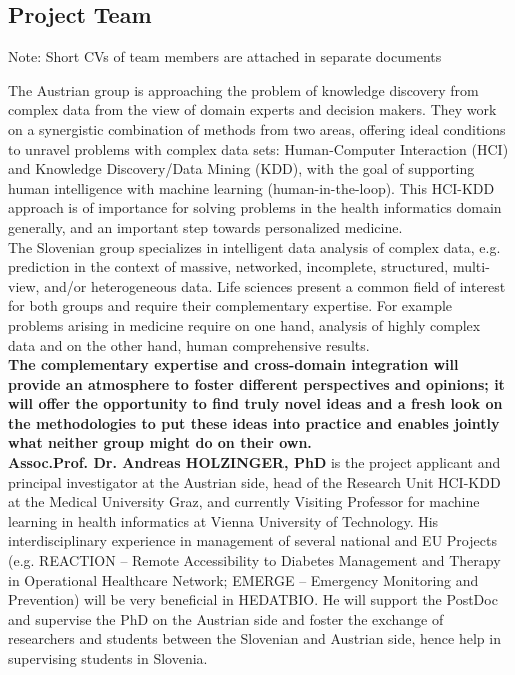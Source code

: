 \documentclass[a4paper,11pt]{article}
\begin{document}
\subsection{Project Team}
Note: Short CVs of team members are attached in separate documents

The Austrian group is approaching the problem of knowledge discovery from complex data from the view of domain experts and decision makers. They work on a synergistic combination of methods from two areas, offering ideal conditions to unravel problems with complex data sets: Human-Computer Interaction (HCI) and Knowledge Discovery/Data Mining (KDD), with the goal of supporting human intelligence with machine learning (human-in-the-loop). This HCI-KDD approach is of importance for solving problems in the health informatics domain generally, and an important step towards personalized medicine.
\\[0,2cm]
The Slovenian group specializes in intelligent data analysis of complex data, e.g. prediction in the context of massive, networked, incomplete, structured, multi-view, and/or heterogeneous data. Life sciences present a common field of interest for both groups and require their complementary expertise. For example problems arising in medicine require on one hand, analysis of highly complex data and on the other hand, human comprehensive results.
\\[0,2cm]
\textbf{The complementary expertise and cross-domain integration will provide an atmosphere to foster different perspectives and opinions; it will offer the opportunity to find truly novel ideas and a fresh look on the methodologies to put these ideas into practice and enables jointly what neither group might do on their own.}
\\[0,2cm]
\textbf{Assoc.Prof. Dr. Andreas HOLZINGER, PhD} is the project applicant and principal investigator at the Austrian side, head of the Research Unit HCI-KDD at the Medical University Graz, and currently Visiting Professor for machine learning in health informatics at Vienna University of Technology. His interdisciplinary experience in management of several national and EU Projects (e.g. REACTION – Remote Accessibility to Diabetes Management and Therapy in Operational Healthcare Network; EMERGE – Emergency Monitoring and Prevention) will be very beneficial in HEDATBIO. He will support the PostDoc and supervise the PhD on the Austrian side and foster the exchange of researchers and students between the Slovenian and Austrian side, hence help in supervising students in Slovenia. 
\end{document}
